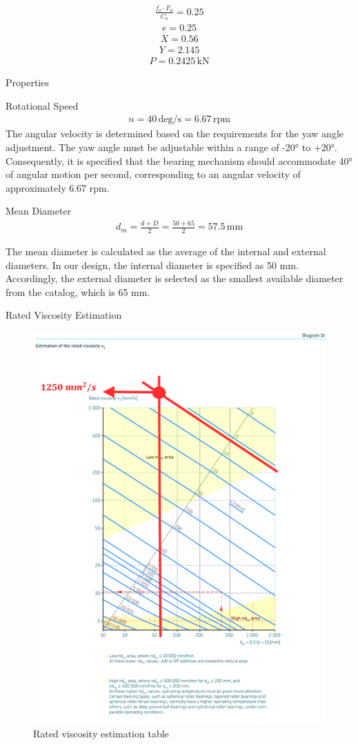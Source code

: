 \documentclass[12pt]{report}
\begin{document}
\begin{align}
\frac{f_o \cdot F_a}{C_o} = 0.25
\end{align}
\begin{align}
e = 0.25
\end{align}
\begin{align}
X=0.56
\end{align}
\begin{align}
Y=2.145
\end{align}
\begin{align}
P=0.2425  \,\mathrm{kN}
\end{align}

Properties

Rotational Speed \begin{align}
n = 40 \, \text{deg/s} = 6.67 \, \text{rpm}
\end{align}
The angular velocity is determined based on the requirements for the yaw angle adjustment. The yaw angle must be adjustable within a range of -20° to +20°. Consequently, it is specified that the bearing mechanism should accommodate 40° of angular motion per second, corresponding to an angular velocity of approximately 6.67 rpm.	

Mean Diameter
\begin{align}
d_m = \frac{d + D}{2} = \frac{50 + 65}{2} = 57.5 \, \mathrm{mm}
\end{align}

The mean diameter is calculated as the average of the internal and external diameters. In our design, the internal diameter is specified as 50 mm. Accordingly, the external diameter is selected as the smallest available diameter from the catalog, which is 65 mm.

Rated Viscosity Estimation

\begin{figure}[H]
    \centering
    \includegraphics[width=0.5\linewidth]{ratedviscosity.png}
    \caption{Rated viscosity estimation table}
    \label{fig:ratedviscosity}
\end{figure}
\end{document}
